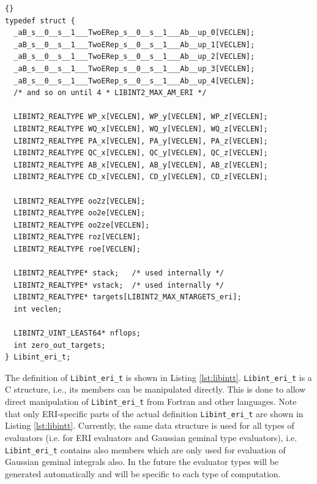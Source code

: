 \documentclass[10pt]{article}
\begin{document}
\begin{lstlisting}[label=lst:libintt,caption=``External'' parts of the
definition of the \LIBINT\ integral evaluator type.]{}
typedef struct {
  _aB_s__0__s__1___TwoERep_s__0__s__1___Ab__up_0[VECLEN];
  _aB_s__0__s__1___TwoERep_s__0__s__1___Ab__up_1[VECLEN];
  _aB_s__0__s__1___TwoERep_s__0__s__1___Ab__up_2[VECLEN];
  _aB_s__0__s__1___TwoERep_s__0__s__1___Ab__up_3[VECLEN];
  _aB_s__0__s__1___TwoERep_s__0__s__1___Ab__up_4[VECLEN];
  /* and so on until 4 * LIBINT2_MAX_AM_ERI */

  LIBINT2_REALTYPE WP_x[VECLEN], WP_y[VECLEN], WP_z[VECLEN];
  LIBINT2_REALTYPE WQ_x[VECLEN], WQ_y[VECLEN], WQ_z[VECLEN];
  LIBINT2_REALTYPE PA_x[VECLEN], PA_y[VECLEN], PA_z[VECLEN];
  LIBINT2_REALTYPE QC_x[VECLEN], QC_y[VECLEN], QC_z[VECLEN];
  LIBINT2_REALTYPE AB_x[VECLEN], AB_y[VECLEN], AB_z[VECLEN];
  LIBINT2_REALTYPE CD_x[VECLEN], CD_y[VECLEN], CD_z[VECLEN];

  LIBINT2_REALTYPE oo2z[VECLEN];
  LIBINT2_REALTYPE oo2e[VECLEN];
  LIBINT2_REALTYPE oo2ze[VECLEN];
  LIBINT2_REALTYPE roz[VECLEN];
  LIBINT2_REALTYPE roe[VECLEN];
  
  LIBINT2_REALTYPE* stack;   /* used internally */
  LIBINT2_REALTYPE* vstack;  /* used internally */
  LIBINT2_REALTYPE* targets[LIBINT2_MAX_NTARGETS_eri];
  int veclen;

  LIBINT2_UINT_LEAST64* nflops;
  int zero_out_targets;
} Libint_eri_t;
\end{lstlisting}

The definition of {\tt Libint\_eri\_t} is shown in Listing \ref{lst:libintt}.
{\tt Libint\_eri\_t} is a C structure, i.e., its members can be manipulated directly.
This is done to allow direct manipulation of {\tt Libint\_eri\_t} from
Fortran and other languages.
Note that only ERI-specific parts of the actual definition {\tt Libint\_eri\_t}
are shown in Listing \ref{lst:libintt}. Currently, the same data structure is
used for all types of evaluators (i.e. for ERI evaluators and Gaussian geminal type evaluators), i.e. {\tt Libint\_eri\_t} contains also members which are only used
for evaluation of Gaussian geminal integrals also. In the future the evaluator types will be generated
automatically and will be specific to each type of computation.
\end{document}
